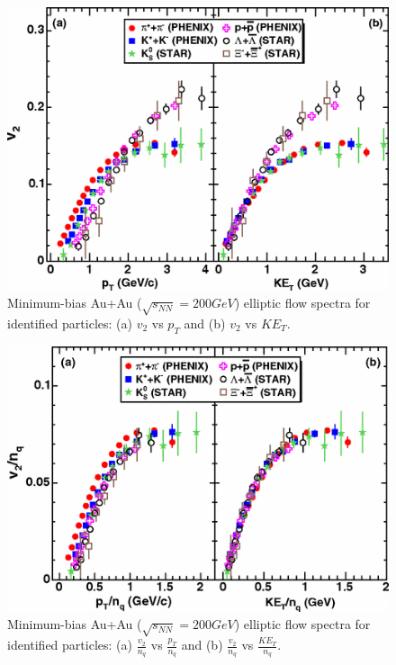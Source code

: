 	\begin{figure}[h]
	  \centering
	  \includegraphics[width=4.5in]{figures/v2Scaling1.png}
	  \caption{Minimum-bias Au+Au ($\sqrt{s_{NN}} = 200 GeV$) elliptic flow spectra for identified particles: (a) $v_{2}$ vs $p_{T}$ and (b) $v_{2}$ vs $KE_{T}$.\cite{2007PhRvL..98p2301A}}\label{fig:v2Scaling1}
	\end{figure}
	
	\begin{figure}[h]
	  \centering
	  \includegraphics[width=4.5in]{figures/v2Scaling2.png}
	  \caption{Minimum-bias Au+Au ($\sqrt{s_{NN}} = 200 GeV$) elliptic flow spectra for identified particles: (a) $\frac{v_{2}}{n_{q}}$ vs $\frac{p_{T}}{n_{q}}$ and (b) $\frac{v_{2}}{n_{q}}$ vs $\frac{KE_{T}}{n_{q}}$.\cite{2007PhRvL..98p2301A}}\label{fig:v2Scaling2}
	\end{figure}

